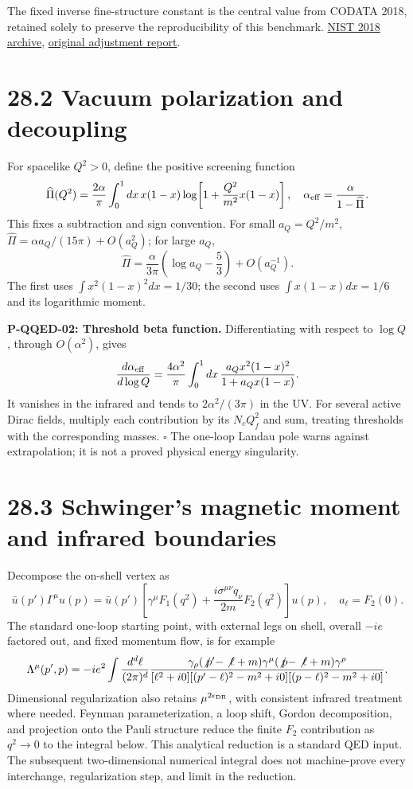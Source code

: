 \documentclass[
  11pt,
  oneside]{book}
\begin{document}
The fixed inverse fine-structure constant is the central value from
CODATA 2018, retained solely to preserve the reproducibility of this
benchmark.
\href{https://physics.nist.gov/cuu/Constants/archive2018.html}{NIST 2018
archive}, \href{https://doi.org/10.1103/RevModPhys.93.025010}{original
adjustment report}.

\section{28.2 Vacuum polarization and decoupling}

For spacelike \(Q^2>0\), define the positive screening function \[
\widehat\Pi(Q^2)=\frac{2\alpha}{\pi}\int_0^1dx\,x(1-x)
\log\!\left[1+\frac{Q^2}{m^2}x(1-x)\right],\quad
\alpha_{\rm eff}=\frac{\alpha}{1-\widehat\Pi}.
\] This fixes a subtraction and sign convention. For small
\(a_Q=Q^2/m^2\), \(\widehat\Pi=\alpha a_Q/(15\pi)+O(a_Q^2)\); for large
\(a_Q\), \[
\widehat\Pi=\frac{\alpha}{3\pi}\left(\log a_Q-\frac53\right)+O(a_Q^{-1}).
\] The first uses \(\int x^2(1-x)^2dx=1/30\); the second uses
\(\int x(1-x)dx=1/6\) and its logarithmic moment.

\label{p-qqed-02}{}

\textbf{P-QQED-02: Threshold beta function.} Differentiating with
respect to \(\log Q\), through \(O(\alpha^2)\), gives \[
\frac{d\alpha_{\rm eff}}{d\log Q}
=\frac{4\alpha^2}{\pi}\int_0^1dx\,
\frac{a_Qx^2(1-x)^2}{1+a_Qx(1-x)}.
\] It vanishes in the infrared and tends to \(2\alpha^2/(3\pi)\) in the
UV. For several active Dirac fields, multiply each contribution by its
\(N_cQ_f^2\) and sum, treating thresholds with the corresponding masses.
\(\square\) The one-loop Landau pole warns against extrapolation; it is
not a proved physical energy singularity.

\section{28.3 Schwinger's magnetic moment and infrared boundaries}

Decompose the on-shell vertex as \[
\bar u(p')\Gamma^\mu u(p)=\bar u(p')
\left[\gamma^\mu F_1(q^2)
+\frac{i\sigma^{\mu\nu}q_\nu}{2m}F_2(q^2)\right]u(p),
\quad a_\ell=F_2(0).
\] The standard one-loop starting point, with external legs on shell,
overall \(-ie\) factored out, and fixed momentum flow, is for example \[
\Lambda^\mu(p',p)=-ie^2\int\frac{d^d\ell}{(2\pi)^d}
\frac{\gamma_\rho(\not p'-\not\ell+m)\gamma^\mu
(\not p-\not\ell+m)\gamma^\rho}
{[\ell^2+i0][(p'-\ell)^2-m^2+i0][(p-\ell)^2-m^2+i0]}.
\] Dimensional regularization also retains \(\mu^{2\epsilon_{\rm DR}}\),
with consistent infrared treatment where needed. Feynman
parameterization, a loop shift, Gordon decomposition, and projection
onto the Pauli structure reduce the finite \(F_2\) contribution as
\(q^2\to0\) to the integral below. This analytical reduction is a
standard QED input. The subsequent two-dimensional numerical integral
does not machine-prove every interchange, regularization step, and limit
in the reduction.
\end{document}
